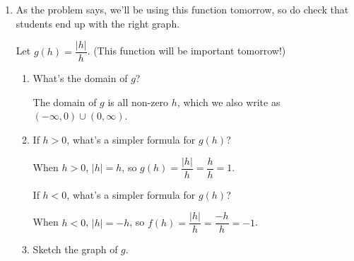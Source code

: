 \documentclass{article}
\begin{document}
\begin{enumerate}
\item  \label{|h|/h}

  \begin{workshop}
    As the problem says, we'll be using this function tomorrow, so do check that students end up with the right graph.
  \end{workshop}

  Let $g(h) = \dfrac{|h|}{h}$. (This function will be important tomorrow!)

  \begin{enumerate}
  \item

    \begin{problem}[0.25in]
      What's the domain of $g$?
    \end{problem}

    \begin{solution}
      The domain of $g$ is all non-zero $h$, which we also write as
      $(-\infty, 0) \cup (0, \infty)$.
    \end{solution}

  \item

    \begin{problem}[0.25in]
      If $h > 0$, what's a simpler formula for $g(h)$?
    \end{problem}

    \begin{solution}
      When $h > 0$, $|h| = h$, so $g(h) = \dfrac{|h|}{h} = \dfrac{h}{h} = 1$.
    \end{solution}

    \begin{problem}[0.25in]
      If $h < 0$, what's a simpler formula for $g(h)$?
    \end{problem}

    \begin{solution}
      When $h < 0$, $|h| = -h$, so $f(h) = \dfrac{|h|}{h} = \dfrac{-h}{h} = -1$.
    \end{solution}

  \item

    \begin{problem}[\vfill]
      Sketch the graph of $g$. 
    \end{problem}

    \begin{solution}
      \begin{center}
      \end{center}      
    \end{solution}
  \end{enumerate}  


\end{enumerate}
\end{document}
